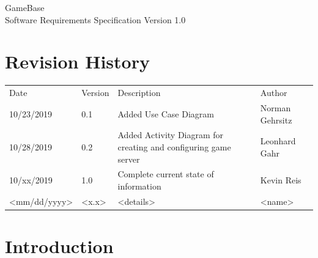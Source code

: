 \documentclass[a4paper,12pt,chapterprefix=false,bibliography=totoc,listof=totoc,]{scrreprt}
\begin{document}
	
\begin{flushright}
GameBase
\\
Software Requirements Specification
\bigbreak
Version 1.0
\end{flushright}
\chapter*{Revision History}
\begin{table}[H]
	\centering
	\everyrow{\hline}
	\begin{tabu} to \textwidth {|X[c]|X[c]|X[c]|X[c]|}
		Date & Version & Description & Author\\
		10/23/2019 & 0.1 & Added Use Case Diagram & Norman Gehrsitz \\
		10/28/2019 & 0.2 & Added Activity Diagram for creating and configuring game server & Leonhard Gahr \\
		10/xx/2019 & 1.0 & Complete current state of information & Kevin Reis \\
		<mm/dd/yyyy> & <x.x> & <details> & <name>\\
	\end{tabu}
	\label{tab:rev-hist}
\end{table}

\tableofcontents

\chapter{Introduction}


\end{document}
